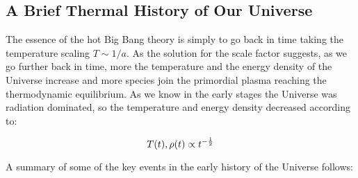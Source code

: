 \subsection{A Brief Thermal History of Our Universe}\label{ss:brief_thermal_history}

The essence of the hot Big Bang theory is simply to go back in time taking
the temperature scaling $T \sim 1/a$. As the solution for the scale
factor suggests, as we go further back in time, more the temperature and
the energy density of the Universe increase and more species join the
primordial plasma reaching the thermodynamic equilibrium. As we know in the
early stages the Universe was radiation dominated, so the temperature and
energy density decreased according to:

\begin{equation}
        T\qty(t), \rho\qty(t) \propto t^{-\frac{1}{2}}
\end{equation}

A summary of some of the key events in the early history of the Universe
follows:

